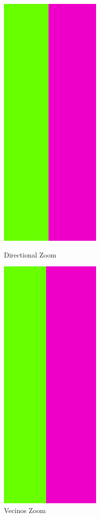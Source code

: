 \begin{figure}[!htb]
\begin{center}
    \includegraphics[scale=0.6]{imagenes/colores_directional_zoom.jpg}
    \caption{Directional Zoom}
        \end{center}
\endminipage
{}
\begin{center}
    \includegraphics[scale=0.6]{imagenes/colores_vecinos_zoom.jpg}
    \caption{Vecinos Zoom}
        \end{center}
\endminipage 
\end{figure}

